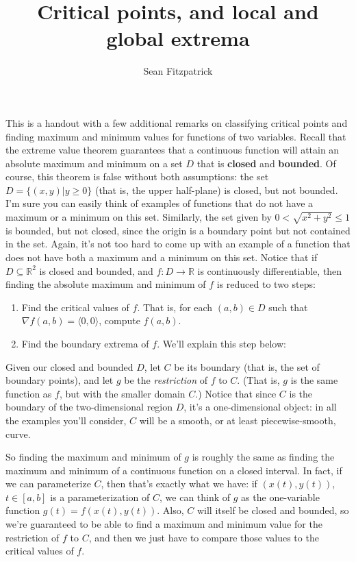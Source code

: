 \documentclass[12pt,letterpaper]{article}
\author{Sean Fitzpatrick}
\title{Critical points, and local and global extrema}
\newcommand{\R}{\mathbb{R}}
\begin{document}
\maketitle

This is a handout with a few additional remarks on classifying critical points and finding maximum and minimum values for functions of two variables. Recall that the extreme value theorem guarantees that a continuous function will attain an absolute maximum and minimum on a set $D$ that is {\bf closed} and {\bf bounded}. Of course, this theorem is false without both assumptions: the set $D=\{(x,y)|y\geq 0\}$ (that is, the upper half-plane) is closed, but not bounded. I'm sure you can easily think of examples of functions that do not have a maximum or a minimum on this set. Similarly, the set given by $0<\sqrt{x^2+y^2}\leq 1$ is bounded, but not closed, since the origin is a boundary point but not contained in the set. Again, it's not too hard to come up with an example of a function that does not have both a maximum and a minimum on this set.
Notice that if $D\subseteq \R^2$ is closed and bounded, and $f:D\to \R$ is continuously differentiable, then finding the absolute maximum and minimum of $f$ is reduced to two steps:
\begin{enumerate}
\item Find the critical values of $f$. That is, for each $(a,b)\in D$ such that $\nabla f(a,b)=\langle 0,0\rangle$, compute $f(a,b)$.
\item Find the boundary extrema of $f$. We'll explain this step below:
\end{enumerate}
Given our closed and bounded $D$, let $C$ be its boundary (that is, the set of boundary points), and let $g$ be the {\em restriction} of $f$ to $C$. (That is, $g$ is the same function as $f$, but with the smaller domain $C$.) Notice that since $C$ is the boundary of the two-dimensional region $D$, it's a one-dimensional object: in all the examples you'll consider, $C$ will be a smooth, or at least piecewise-smooth, curve.

So finding the maximum and minimum of $g$ is roughly the same as finding the maximum and minimum of a continuous function on a closed interval. In fact, if we can parameterize $C$, then that's exactly what we have: if $(x(t),y(t))$, $t\in [a,b]$ is a parameterization of $C$, we can think of $g$ as the one-variable function $g(t)=f(x(t),y(t))$. Also, $C$ will itself be closed and bounded, so we're guaranteed to be able to find a maximum and minimum value for the restriction of $f$ to $C$, and then we just have to compare those values to the critical values of $f$.
\end{document}
